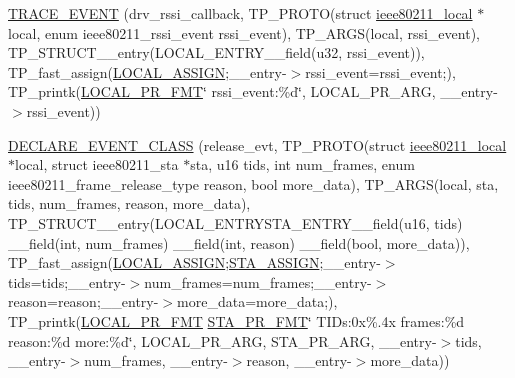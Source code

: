 \begin{DoxyCompactItemize}
\item 
\hyperlink{driver-trace_8h_a03c96d1c6e068b95abe4ae39cd6719ed}{T\-R\-A\-C\-E\-\_\-\-E\-V\-E\-N\-T} (drv\-\_\-rssi\-\_\-callback, T\-P\-\_\-\-P\-R\-O\-T\-O(struct \hyperlink{structieee80211__local}{ieee80211\-\_\-local} $\ast$local, enum ieee80211\-\_\-rssi\-\_\-event rssi\-\_\-event), T\-P\-\_\-\-A\-R\-G\-S(local, rssi\-\_\-event), T\-P\-\_\-\-S\-T\-R\-U\-C\-T\-\_\-\-\_\-entry(L\-O\-C\-A\-L\-\_\-\-E\-N\-T\-R\-Y\-\_\-\-\_\-field(u32, rssi\-\_\-event)), T\-P\-\_\-fast\-\_\-assign(\hyperlink{driver-trace_8h_ab19d9141887ea92ef9640df06a51e0a1}{L\-O\-C\-A\-L\-\_\-\-A\-S\-S\-I\-G\-N};\-\_\-\-\_\-entry-\/$>$rssi\-\_\-event=rssi\-\_\-event;), T\-P\-\_\-printk(\hyperlink{driver-trace_8h_a09833af423135e21ffe99a59ae088cf1}{L\-O\-C\-A\-L\-\_\-\-P\-R\-\_\-\-F\-M\-T}\char`\"{} rssi\-\_\-event\-:\%d\char`\"{}, L\-O\-C\-A\-L\-\_\-\-P\-R\-\_\-\-A\-R\-G, \-\_\-\-\_\-entry-\/$>$rssi\-\_\-event))
\item 
\hyperlink{driver-trace_8h_a2ba1e0adc875d9d790a47fc1bc6f5346}{D\-E\-C\-L\-A\-R\-E\-\_\-\-E\-V\-E\-N\-T\-\_\-\-C\-L\-A\-S\-S} (release\-\_\-evt, T\-P\-\_\-\-P\-R\-O\-T\-O(struct \hyperlink{structieee80211__local}{ieee80211\-\_\-local} $\ast$local, struct ieee80211\-\_\-sta $\ast$sta, u16 tids, int num\-\_\-frames, enum ieee80211\-\_\-frame\-\_\-release\-\_\-type reason, bool more\-\_\-data), T\-P\-\_\-\-A\-R\-G\-S(local, sta, tids, num\-\_\-frames, reason, more\-\_\-data), T\-P\-\_\-\-S\-T\-R\-U\-C\-T\-\_\-\-\_\-entry(L\-O\-C\-A\-L\-\_\-\-E\-N\-T\-R\-Y\-S\-T\-A\-\_\-\-E\-N\-T\-R\-Y\-\_\-\-\_\-field(u16, tids) \-\_\-\-\_\-field(int, num\-\_\-frames) \-\_\-\-\_\-field(int, reason) \-\_\-\-\_\-field(bool, more\-\_\-data)), T\-P\-\_\-fast\-\_\-assign(\hyperlink{driver-trace_8h_ab19d9141887ea92ef9640df06a51e0a1}{L\-O\-C\-A\-L\-\_\-\-A\-S\-S\-I\-G\-N};\hyperlink{driver-trace_8h_abbd837b5fc444c0cb48b5954f8ad068a}{S\-T\-A\-\_\-\-A\-S\-S\-I\-G\-N};\-\_\-\-\_\-entry-\/$>$tids=tids;\-\_\-\-\_\-entry-\/$>$num\-\_\-frames=num\-\_\-frames;\-\_\-\-\_\-entry-\/$>$reason=reason;\-\_\-\-\_\-entry-\/$>$more\-\_\-data=more\-\_\-data;), T\-P\-\_\-printk(\hyperlink{driver-trace_8h_a09833af423135e21ffe99a59ae088cf1}{L\-O\-C\-A\-L\-\_\-\-P\-R\-\_\-\-F\-M\-T} \hyperlink{driver-trace_8h_a73d0cd445b999888e3f21698b769c843}{S\-T\-A\-\_\-\-P\-R\-\_\-\-F\-M\-T}\char`\"{} T\-I\-Ds\-:0x\%.\-4x frames\-:\%d reason\-:\%d more\-:\%d\char`\"{}, L\-O\-C\-A\-L\-\_\-\-P\-R\-\_\-\-A\-R\-G, S\-T\-A\-\_\-\-P\-R\-\_\-\-A\-R\-G, \-\_\-\-\_\-entry-\/$>$tids, \-\_\-\-\_\-entry-\/$>$num\-\_\-frames, \-\_\-\-\_\-entry-\/$>$reason, \-\_\-\-\_\-entry-\/$>$more\-\_\-data))

\end{DoxyCompactItemize}
